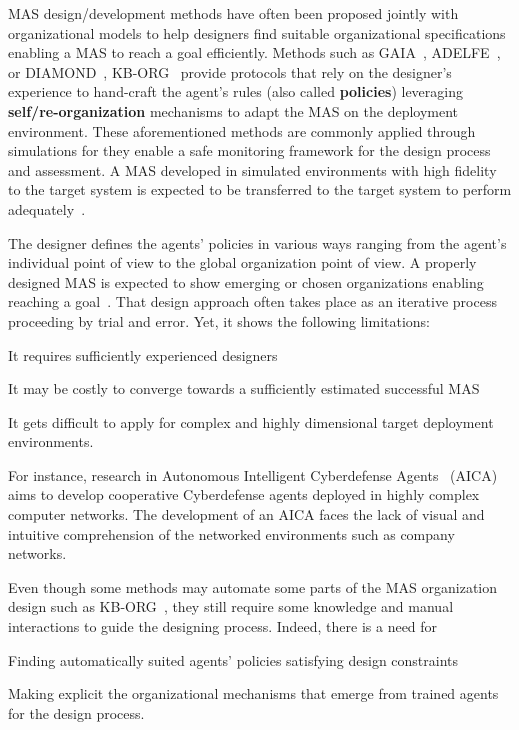 MAS design/development methods have often been proposed jointly with organizational models to help designers find suitable organizational specifications enabling a MAS to reach a goal efficiently. Methods such as GAIA~\cite{Wooldridge2000,Cernuzzi2014}, ADELFE~\cite{Mefteh2015}, or DIAMOND~\cite{Jamont2015}, KB-ORG~\cite{Sims2008} provide protocols that rely on the designer's experience to hand-craft the agent's rules (also called \textbf{policies}) leveraging \textbf{self/re-organization} mechanisms to adapt the MAS on the deployment environment.
These aforementioned methods are commonly applied through simulations for they enable a safe monitoring framework for the design process and assessment. A MAS developed in simulated environments with high fidelity to the target system is expected to be transferred to the target system to perform adequately~\cite{Schon2021}.

The designer defines the agents' policies in various ways ranging from the agent's individual point of view to the global organization point of view. A properly designed MAS is expected to show emerging or chosen organizations enabling reaching a goal~\cite{Picard2009reorganisation}. That design approach often takes place as an iterative process proceeding by trial and error. Yet, it shows the following limitations:
\begin{enumerate*}[label=\roman*),itemjoin={;\quad}]
    \item It requires sufficiently experienced designers
    \item It may be costly to converge towards a sufficiently estimated successful MAS
    \item It gets difficult to apply for complex and highly dimensional target deployment environments.
\end{enumerate*}
For instance, research in Autonomous Intelligent Cyberdefense Agents~\cite{Kott2023} (AICA) aims to develop cooperative Cyberdefense agents deployed in highly complex computer networks. The development of an AICA faces the lack of visual and intuitive comprehension of the networked environments such as company networks.


Even though some methods may automate some parts of the MAS organization design such as KB-ORG~\cite{Sims2008}, they still require some knowledge and manual interactions to guide the designing process. Indeed, there is a need for
\begin{enumerate*}[label=\roman*),itemjoin={; and \ }]
    \item Finding automatically suited agents' policies satisfying design constraints
    \item Making explicit the organizational mechanisms that emerge from trained agents for the design process.
\end{enumerate*}

